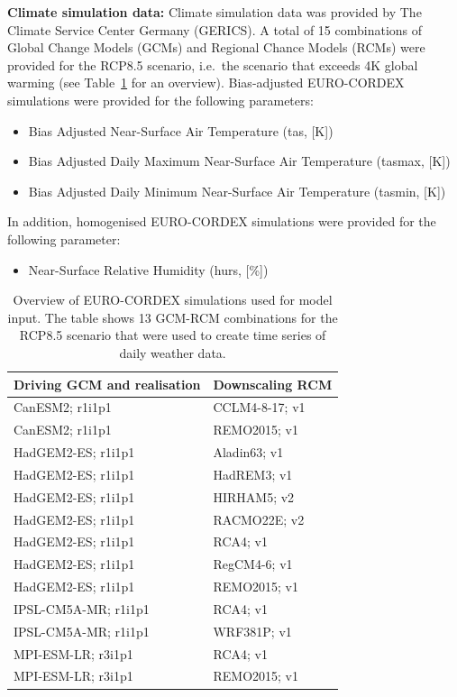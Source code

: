 \documentclass[a4paper, 11pt]{scrartcl}
\begin{document}
\textbf{Climate simulation data:} Climate simulation data was provided by The Climate Service Center Germany (GERICS). A total of 15 combinations of Global Change Models (GCMs) and Regional Chance Models (RCMs) were provided for the RCP8.5 scenario, i.e.\ the scenario that exceeds 4K global warming (see Table~\ref{tab:climate_models} for an overview). Bias-adjusted EURO-CORDEX simulations were provided for the following parameters:
\begin{itemize}[noitemsep]
\item Bias Adjusted Near-Surface Air Temperature (tas, [K])
\item Bias Adjusted Daily Maximum Near-Surface Air Temperature (tasmax, [K])
\item Bias Adjusted Daily Minimum Near-Surface Air Temperature (tasmin, [K])
\end{itemize}

In addition, homogenised EURO-CORDEX simulations were provided for the following parameter:
\begin{itemize}
\item Near-Surface Relative Humidity (hurs, [\%])
\end{itemize}

\begin{table}[h!]
\caption[Overview of EURO-CORDEX simulations used for model input]{Overview of EURO-CORDEX simulations used for model input. The table shows 13 GCM-RCM combinations for the RCP8.5 scenario that were used to create time series of daily weather data.}
\label{tab:climate_models}
\begin{tabularx}{\textwidth}{ll}
\toprule
\textbf{Driving GCM and realisation}  & \textbf{Downscaling RCM} 	\\
\midrule
CanESM2; r1i1p1 				 	  & CCLM4-8-17; v1  		 	\\
CanESM2; r1i1p1 				 	  & REMO2015; v1 				\\
HadGEM2-ES; r1i1p1 					  & Aladin63; v1 				\\
HadGEM2-ES; r1i1p1 					  & HadREM3; v1 				\\
HadGEM2-ES; r1i1p1 					  & HIRHAM5; v2 				\\
HadGEM2-ES; r1i1p1 					  & RACMO22E; v2 				\\
HadGEM2-ES; r1i1p1 					  & RCA4; v1 					\\
HadGEM2-ES; r1i1p1 					  & RegCM4-6; v1 				\\
HadGEM2-ES; r1i1p1 					  & REMO2015; v1 				\\
IPSL-CM5A-MR; r1i1p1 				  & RCA4; v1 					\\
IPSL-CM5A-MR; r1i1p1 				  & WRF381P; v1 				\\
MPI-ESM-LR; r3i1p1 					  & RCA4; v1 					\\
MPI-ESM-LR; r3i1p1 					  & REMO2015; v1				\\
\bottomrule
\end{tabularx}
\end{table}
\end{document}
